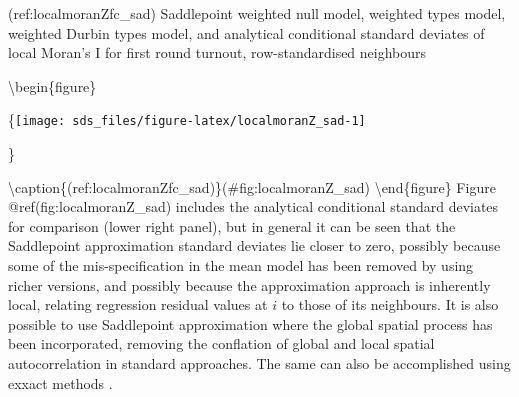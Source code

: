 \documentclass[]{book}
\newenvironment{Shaded}{\begin{snugshade}}{\end{snugshade}}
\newcommand{\CharTok}[1]{\textcolor[rgb]{0.31,0.60,0.02}{#1}}
\newcommand{\DataTypeTok}[1]{\textcolor[rgb]{0.13,0.29,0.53}{#1}}
\newcommand{\DecValTok}[1]{\textcolor[rgb]{0.00,0.00,0.81}{#1}}
\newcommand{\KeywordTok}[1]{\textcolor[rgb]{0.13,0.29,0.53}{\textbf{#1}}}
\newcommand{\NormalTok}[1]{#1}
\newcommand{\OperatorTok}[1]{\textcolor[rgb]{0.81,0.36,0.00}{\textbf{#1}}}
\newcommand{\OtherTok}[1]{\textcolor[rgb]{0.56,0.35,0.01}{#1}}
\newcommand{\StringTok}[1]{\textcolor[rgb]{0.31,0.60,0.02}{#1}}
\begin{document}
(ref:localmoranZfc\_sad) Saddlepoint weighted null model, weighted types model, weighted Durbin types model, and analytical conditional standard deviates of local Moran's I for first round turnout, row-standardised neighbours

\begin{Shaded}
\end{Shaded}

\textbackslash{}begin\{figure\}

\{\centering \texttt{[image: sds\_files/figure-latex/localmoranZ\_sad-1]}

\}

\textbackslash{}caption\{(ref:localmoranZfc\_sad)\}(\#fig:localmoranZ\_sad)
\textbackslash{}end\{figure\}
Figure @ref(fig:localmoranZ\_sad) includes the analytical conditional standard deviates for comparison (lower right panel), but in general it can be seen that the Saddlepoint approximation standard deviates lie closer to zero, possibly because some of the mis-specification in the mean model has been removed by using richer versions, and possibly because the approximation approach is inherently local, relating regression residual values at \(i\) to those of its neighbours. It is also possible to use Saddlepoint approximation where the global spatial process has been incorporated, removing the conflation of global and local spatial autocorrelation in standard approaches. The same can also be accomplished using exxact methods \citep{bivandetal:09}.
\end{document}
